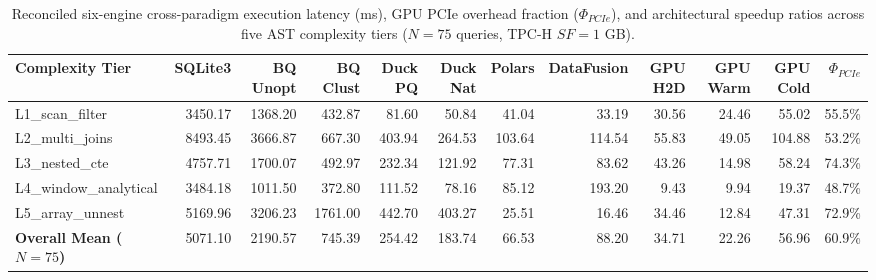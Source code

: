 \begin{table}[htbp]
\centering
\caption{Reconciled six-engine cross-paradigm execution latency (ms), GPU PCIe overhead fraction ($\Phi_{PCIe}$), and architectural speedup ratios across five AST complexity tiers ($N=75$ queries, TPC-H $SF=1$ GB).}
\label{tab:reconciled_master_sf1}
\begin{tabular}{lrrrrrrrrrrr}
\toprule
\textbf{Complexity Tier} & \textbf{SQLite3} & \textbf{BQ Unopt} & \textbf{BQ Clust} & \textbf{Duck PQ} & \textbf{Duck Nat} & \textbf{Polars} & \textbf{DataFusion} & \textbf{GPU H2D} & \textbf{GPU Warm} & \textbf{GPU Cold} & \textbf{$\Phi_{PCIe}$} \\
\midrule
L1\_scan\_filter & 3450.17 & 1368.20 & 432.87 & 81.60 & 50.84 & 41.04 & 33.19 & 30.56 & 24.46 & 55.02 & 55.5\% \\
L2\_multi\_joins & 8493.45 & 3666.87 & 667.30 & 403.94 & 264.53 & 103.64 & 114.54 & 55.83 & 49.05 & 104.88 & 53.2\% \\
L3\_nested\_cte & 4757.71 & 1700.07 & 492.97 & 232.34 & 121.92 & 77.31 & 83.62 & 43.26 & 14.98 & 58.24 & 74.3\% \\
L4\_window\_analytical & 3484.18 & 1011.50 & 372.80 & 111.52 & 78.16 & 85.12 & 193.20 & 9.43 & 9.94 & 19.37 & 48.7\% \\
L5\_array\_unnest & 5169.96 & 3206.23 & 1761.00 & 442.70 & 403.27 & 25.51 & 16.46 & 34.46 & 12.84 & 47.31 & 72.9\% \\
\midrule
\textbf{Overall Mean ($N=75$)} & 5071.10 & 2190.57 & 745.39 & 254.42 & 183.74 & 66.53 & 88.20 & 34.71 & 22.26 & 56.96 & 60.9\% \\
\bottomrule
\end{tabular}
\end{table}